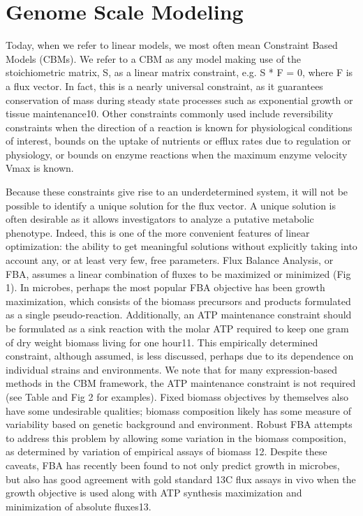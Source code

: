 \documentclass[phd,tocprelim]{cornell}
\theoremstyle{break}
\begin{document}
\section{Genome Scale Modeling}
Today, when we refer to linear models, we most often mean Constraint
Based Models (CBMs). We refer to a CBM as any model making use of the
stoichiometric matrix, S, as a linear matrix constraint, e.g. S * F =
0, where F is a flux vector. In fact, this is a nearly universal
constraint, as it guarantees conservation of mass during steady state
processes such as exponential growth or tissue maintenance10. Other
constraints commonly used include reversibility constraints when the
direction of a reaction is known for physiological conditions of
interest, bounds on the uptake of nutrients or efflux rates due to
regulation or physiology, or bounds on enzyme reactions when the
maximum enzyme velocity Vmax is known.

Because these constraints give rise to an underdetermined system, it
will not be possible to identify a unique solution for the flux
vector. A unique solution is often desirable as it allows
investigators to analyze a putative metabolic phenotype. Indeed, this
is one of the more convenient features of linear optimization: the
ability to get meaningful solutions without explicitly taking into
account any, or at least very few, free parameters.  Flux Balance
Analysis, or FBA, assumes a linear combination of fluxes to be
maximized or minimized (Fig 1). In microbes, perhaps the most popular
FBA objective has been growth maximization, which consists of the
biomass precursors and products formulated as a single
pseudo-reaction. Additionally, an ATP maintenance constraint should be
formulated as a sink reaction with the molar ATP required to keep one
gram of dry weight biomass living for one hour11. This empirically
determined constraint, although assumed, is less discussed, perhaps
due to its dependence on individual strains and environments.  We note
that for many expression-based methods in the CBM framework, the ATP
maintenance constraint is not required (see Table and Fig 2 for
examples). Fixed biomass objectives by themselves also have some
undesirable qualities; biomass composition likely has some measure of
variability based on genetic background and environment.  Robust FBA
attempts to address this problem by allowing some variation in the
biomass composition, as determined by variation of empirical assays of
biomass 12.  Despite these caveats, FBA has recently been found to not
only predict growth in microbes, but also has good agreement with gold
standard 13C flux assays in vivo when the growth objective is used
along with ATP synthesis maximization and minimization of absolute
fluxes13.
\end{document}
